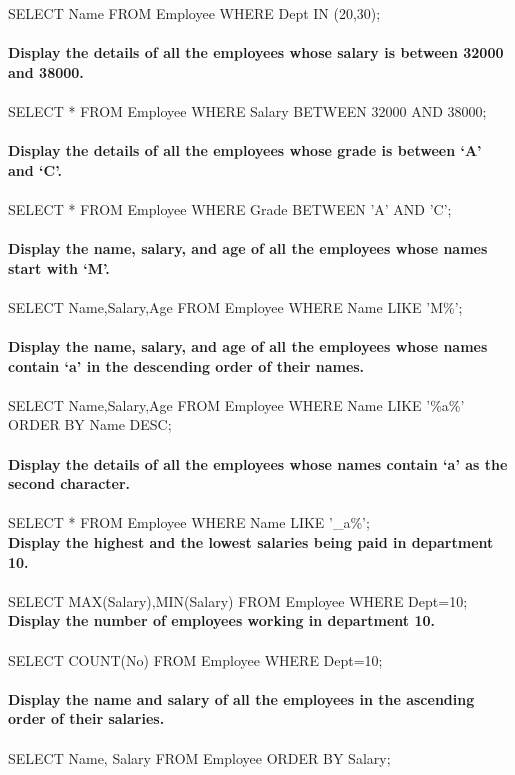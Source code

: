 \documentclass[
a4paper]{article}
\begin{document}
\begin{large}
		SELECT Name FROM Employee WHERE Dept IN (20,30);\\
		\\
		\textbf{Display the details of all the employees whose salary is between 32000 and 38000.}\\
		\\
		SELECT * FROM Employee WHERE Salary BETWEEN 32000 AND 38000;\\
		\\
		\textbf{Display the details of all the employees whose grade is between ‘A’ and ‘C’.}\\
		\\
		SELECT * FROM Employee WHERE Grade BETWEEN 'A' AND 'C';\\
		\\
		\textbf{Display the name, salary, and age of all the employees whose names start with ‘M’.}\\
		\\
		SELECT Name,Salary,Age FROM Employee WHERE Name LIKE 'M\%';\\
		\\
		\textbf{Display the name, salary, and age of all the employees whose names contain ‘a’ in the descending order of their names.}\\
		\\
		SELECT Name,Salary,Age FROM Employee WHERE Name LIKE '\%a\%' ORDER BY Name DESC;\\
		\\
		\textbf{Display the details of all the employees whose names contain ‘a’ as the second character.}\\
		\\		
		SELECT * FROM Employee WHERE Name LIKE '\_a\%';
		\\
		\textbf{Display the highest and the lowest salaries being paid in department 10.}\\
		\\
		SELECT MAX(Salary),MIN(Salary) FROM Employee WHERE Dept=10;
		\\
		\textbf{Display the number of employees working in department 10.}\\
		\\
		SELECT COUNT(No) FROM Employee WHERE Dept=10;\\
		\\
		\textbf{Display the name and salary of all the employees in the ascending order of their salaries.}\\
		\\
		SELECT Name, Salary FROM Employee ORDER BY Salary;\\

\end{large}
\end{document}
